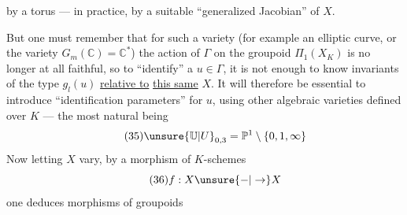 by a torus --- in practice, by a suitable ``generalized Jacobian'' of $X$.

But one must remember that for such a variety (for example an elliptic curve, or the variety $G_m(\mathbb C)=\mathbb C^*$) the action of $\Gamma$ on the groupoid $\Pi_1(X_K)$ is no longer at all faithful, so to ``identify'' a $u\in\Gamma$, it is not enough to know invariants of the type $g_l(u)$ \uline{relative to} \uline{this same} $X$. It will therefore be essential to introduce ``identification parameters'' for $u$, using other algebraic varieties defined over $K$ --- the most natural being
\[
\tag{35}\unsure{\mathbb U|U}_{0,3}=\mathbb P^1\setminus\{0,1,\infty\}
\]
Now letting $X$ vary, by  a morphism of $K$-schemes
\[
\tag{36}f:X\unsure{\mathbin{-}|\to}X
\]
one deduces morphisms of groupoids
